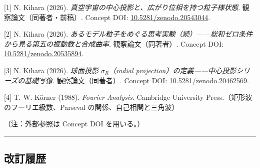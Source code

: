 \documentclass[
]{ltjsarticle}
\begin{document}
{[}1{]} N. Kihara (2026).
\emph{真空宇宙の中心投影と、広がり位相を持つ粒子様状態}.
観察論文（同著者・前稿）. Concept DOI:
\href{https://doi.org/10.5281/zenodo.20543044}{10.5281/zenodo.20543044}.

{[}2{]} N. Kihara (2026).
\emph{あるモデル粒子をめぐる思考実験（続）------総和ゼロ条件から見る第五の振動数と合成曲率}.
観察論文（同著者）. Concept DOI:
\href{https://doi.org/10.5281/zenodo.20535894}{10.5281/zenodo.20535894}.

{[}3{]} N. Kihara (2026). \emph{球面投影 \(\sigma_R\)（radial
projection）の定義------中心投影シリーズの基礎写像}. 観察論文（同著者）.
Concept DOI:
\href{https://doi.org/10.5281/zenodo.20462569}{10.5281/zenodo.20462569}.

{[}4{]} T. W. Körner (1988). \emph{Fourier Analysis}. Cambridge
University Press.（矩形波のフーリエ級数、Parseval
の関係、自己相関と三角波）

（注：外部参照は Concept DOI を用いる。）

\begin{center}\rule{0.5\linewidth}{0.5pt}\end{center}

\subsection{改訂履歴}\label{ux6539ux8a02ux5c65ux6b74}
\end{document}
